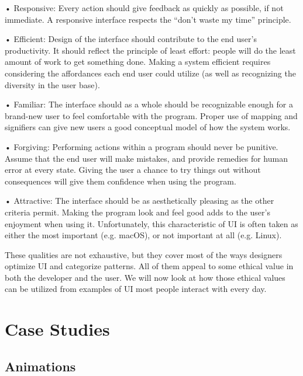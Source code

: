 \documentclass[12pt, oneside]{article}
\begin{document}
• Responsive: Every action should give feedback as quickly as possible, if not immediate. A responsive interface respects the ``don't waste my time'' principle.

• Efficient: Design of the interface should contribute to the end user's productivity. It should reflect the principle of least effort: people will do the least amount of work to get something done. Making a system efficient requires considering the affordances each end user could utilize (as well as recognizing the diversity in the user base).

• Familiar: The interface should as a whole should be recognizable enough for a brand-new user to feel comfortable with the program. Proper use of mapping and signifiers can give new users a good conceptual model of how the system works.

• Forgiving: Performing actions within a program should never be punitive. Assume that the end user will make mistakes, and provide remedies for human error at every state. Giving the user a chance to try things out without consequences will give them confidence when using the program.

• Attractive: The interface should be as aesthetically pleasing as the other criteria permit. Making the program look and feel good adds to the user's enjoyment when using it. Unfortunately, this characteristic of UI is often taken as either the most important (e.g. macOS), or not important at all (e.g. Linux).

These qualities are not exhaustive, but they cover most of the ways designers optimize UI and categorize patterns. All of them appeal to some ethical value in both the developer and the user. We will now look at how those ethical values can be utilized from examples of UI most people interact with every day.

\section{Case Studies}

\subsection{Animations}
\end{document}
